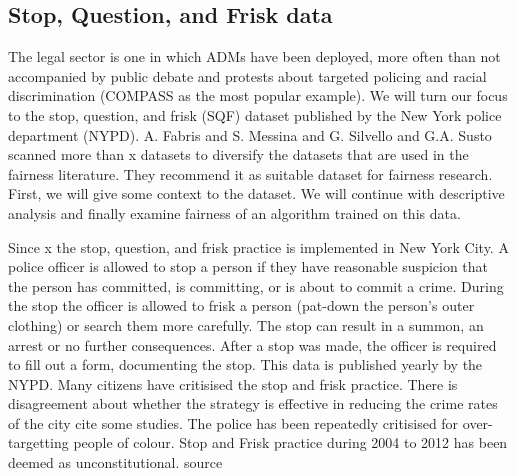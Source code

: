 \subsection*{Stop, Question, and Frisk data}

The legal sector is one in which ADMs have been deployed, more often than not accompanied by public debate and protests about targeted policing and racial discrimination (COMPASS as the most popular example). We will turn our focus to the stop, question, and frisk (SQF) dataset published by the New York police department (NYPD). A. Fabris and S. Messina and G. Silvello and G.A. Susto scanned more than x datasets to diversify the datasets that are used in the fairness literature. They recommend it as suitable dataset for fairness research. First, we will give some context to the dataset. We will continue with descriptive analysis and finally examine fairness of an algorithm trained on this data.

Since x the stop, question, and frisk practice is implemented in New York City. A police officer is allowed to stop a person if they have reasonable suspicion that the person has committed, is committing, or is about to commit a crime.
During the stop the officer is allowed to frisk a person (pat-down the person's outer clothing) or search them more carefully.
The stop can result in a summon, an arrest or no further consequences. After a stop was made, the officer is required to fill out a form, documenting the stop. This data is published yearly by the NYPD.
Many citizens have critisised the stop and frisk practice. There is disagreement about whether the strategy is effective in reducing the crime rates of the city {\color{red}cite some studies}. The police has been repeatedly critisised for over-targetting people of colour.
Stop and Frisk practice during 2004 to 2012 has been deemed as unconstitutional. {\color{red} source}

